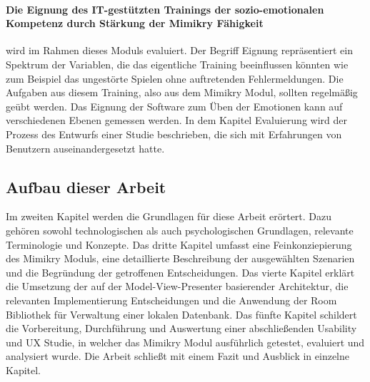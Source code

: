 \paragraph{Die Eignung des IT-gestützten Trainings der sozio-emotionalen\\ Kompetenz durch Stärkung der Mimikry Fähigkeit}wird im Rahmen dieses Moduls evaluiert. Der Begriff Eignung repräsentiert ein Spektrum der Variablen, die das eigentliche Training beeinflussen könnten wie zum Beispiel das ungestörte Spielen ohne auftretenden Fehlermeldungen. Die Aufgaben aus diesem Training, also aus dem Mimikry Modul, sollten regelmäßig geübt werden. Das Eignung der Software zum Üben der Emotionen kann auf verschiedenen Ebenen gemessen werden. In dem Kapitel Evaluierung wird der Prozess des Entwurfs einer Studie beschrieben, die sich mit Erfahrungen von Benutzern auseinandergesetzt hatte. 
\newpage
\subsection{Aufbau dieser Arbeit}
Im zweiten Kapitel werden die Grundlagen für diese Arbeit erörtert. Dazu gehören sowohl technologischen als auch psychologischen Grundlagen, relevante Terminologie und Konzepte.
Das dritte Kapitel umfasst eine Feinkonziepierung des Mimikry Moduls, eine detaillierte Beschreibung der ausgewählten Szenarien und die Begründung der getroffenen Entscheidungen.
Das vierte Kapitel erklärt die Umsetzung der auf der Model-View-Presenter basierender Architektur, die relevanten Implementierung Entscheidungen und die Anwendung der Room Bibliothek für Verwaltung einer lokalen Datenbank.
Das fünfte Kapitel schildert die Vorbereitung, Durchführung und Auswertung einer abschließenden Usability und UX Studie, in welcher das Mimikry Modul ausführlich getestet, evaluiert und analysiert wurde. 
Die Arbeit schließt mit einem Fazit und Ausblick in einzelne Kapitel.
